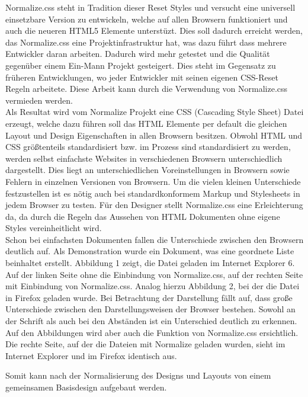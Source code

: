 \documentclass[12pt,journal,compsoc]{IEEEtran}
\begin{document}
Normalize.css steht in Tradition dieser Reset Styles und versucht eine universell
einsetzbare Version zu entwickeln, welche auf allen Browsern funktioniert und auch die neueren HTML5 Elemente unterstüzt. Dies soll dadurch erreicht werden,
das Normalize.css eine Projektinfrastruktur hat, was dazu führt dass mehrere Entwickler daran arbeiten. Dadurch wird mehr getestet und die Qualität gegenüber einem Ein-Mann Projekt gesteigert. 
Dies steht im Gegensatz zu früheren  Entwicklungen, wo jeder Entwickler mit seinen eigenen CSS-Reset Regeln arbeitete. Diese Arbeit kann durch die Verwendung von Normalize.css vermieden werden.
\\
Als Resultat wird vom Normalize Projekt eine CSS (Cascading Style Sheet) Datei erzeugt, welche dazu führen soll das HTML Elemente per default die gleichen Layout und Design Eigenschaften in allen Browsern besitzen.
Obwohl HTML und CSS größtenteils standardisiert bzw. im Prozess sind standardisiert zu werden\cite{standarts}\cite{drafts}, werden selbst einfachste Websites in verschiedenen Browsern unterschiedlich dargestellt.
Dies liegt an unterschiedlichen Voreinstellungen in Browsern sowie Fehlern in einzelnen Versionen von Browsern.
Um die vielen kleinen Unterschiede festzustellen ist es nötig auch bei standardkonformem Markup und Stylesheets in jedem Browser zu testen.
Für den Designer stellt Normalize.css eine Erleichterung da, da durch die Regeln das Aussehen von HTML Dokumenten ohne eigene Styles vereinheitlicht wird.
\\
Schon bei einfachsten Dokumenten fallen die Unterschiede zwischen den Browsern deutlich auf. Als Demonstration wurde ein Dokument, was eine geordnete Liste beinhaltet erstellt. Abbildung 1 zeigt, die Datei geladen im Internet Explorer 6. Auf der linken Seite ohne die Einbindung von Normalize.css,
auf der rechten Seite mit Einbindung von Normalize.css. Analog hierzu Abbildung 2, bei der die Datei in Firefox geladen wurde.
Bei Betrachtung der Darstellung fällt auf, dass große Unterschiede zwischen den Darstellungsweisen der Browser bestehen. Sowohl an der Schrift als auch bei den Abständen ist ein Unterschied deutlich zu erkennen. Auf den Abbildungen wird aber auch die Funktion von Normalize.css ersichtlich. Die rechte Seite, auf der die Dateien mit Normalize geladen wurden, sieht im Internet Explorer und im Firefox identisch aus.

Somit kann nach der Normalisierung des Designs und Layouts von einem gemeinsamen Basisdesign aufgebaut werden.
\end{document}
